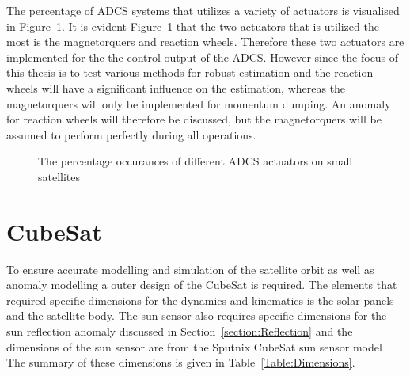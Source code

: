 The percentage of ADCS systems that utilizes a variety of actuators is visualised in Figure~\ref{fig:ActuatorOccurances}. It is evident Figure~\ref{fig:ActuatorOccurances} that the two actuators that is utilized the most is the magnetorquers and reaction wheels. Therefore these two actuators are implemented for the the control output of the ADCS. However since the focus of this thesis is to test various methods for robust estimation and the reaction wheels will have a significant influence on the estimation, whereas the magnetorquers will only be implemented for momentum dumping. An anomaly for reaction wheels will therefore be discussed, but the magnetorquers will be assumed to perform perfectly during all operations.

\begin{figure}
	\centering
	\caption{The percentage occurances of different ADCS actuators on small satellites}
	\label{fig:ActuatorOccurances}
\end{figure}

\section{CubeSat}
To ensure accurate modelling and simulation of the satellite orbit as well as anomaly modelling a outer design of the CubeSat is required. The elements that required specific dimensions for the dynamics and kinematics is the solar panels and the satellite body. The sun sensor also requires specific dimensions for the sun reflection anomaly discussed in Section~\ref{section:Reflection} and the dimensions of the sun sensor are from the Sputnix CubeSat sun sensor model~\cite{SputnixSunSensor}. The summary of these dimensions is given in Table~\ref{Table:Dimensions}.

